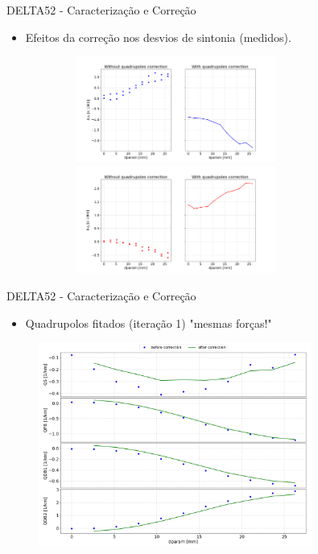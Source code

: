\documentclass{beamer}					  %
\begin{document}
\begin{frame}{DELTA52 - Caracterização e Correção}
    \begin{itemize}
    		\item Efeitos da correção nos desvios de sintonia (medidos).
    \end{itemize}
    \begin{figure}[H]
        	\centering
            \includegraphics[height=3.5cm, width=9cm]{2024-01-26/figures/loco_tunex_corr.png}\\ 
            \includegraphics[height=3.5cm, width=9cm]{2024-01-26/figures/loco_tuney_corr.png}\\ 
    \end{figure} 
\end{frame}


\begin{frame}{DELTA52 - Caracterização e Correção}
    \begin{itemize}
    		\item Quadrupolos fitados (iteração 1) "mesmas forças!"
    \end{itemize}
    \begin{figure}[H]
        	\centering
            \includegraphics[width=0.8\textwidth]{2024-01-26/figures/quads_stren_with_corr.png}
            \label{fig:bba}
    \end{figure} 
\end{frame}
\end{document}
